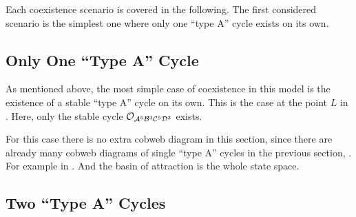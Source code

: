 Each coexistence scenario is covered in the following.
The first considered scenario is the simplest one where only one ``type A'' cycle exists on its own.


\subsection{Only One ``Type A'' Cycle}
\label{sec:arch.coex.A}

As mentioned above, the most simple case of coexistence in this model is the existence of a stable ``type A'' cycle on its own.
This is the case at the point $L$ in .
Here, only the stable cycle $\mathcal{O}_{\mathcal{A}^5\mathcal{B}^3\mathcal{C}^5\mathcal{D}^3}$ exists.

For this case there is no extra cobweb diagram in this section, since there are already many cobweb diagrams of single ``type A'' cycles in the previous section, .
For example in .
And the basin of attraction is the whole state space.

\subsection{Two ``Type A'' Cycles}
\label{sec:arch.coex.AA}

